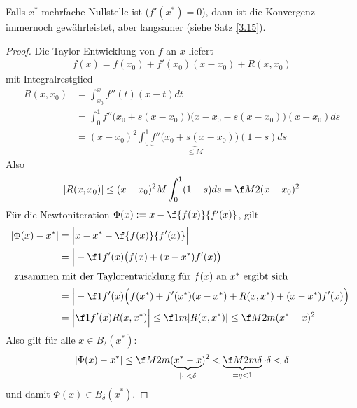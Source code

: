 \documentclass[11pt]{scrartcl}
\begin{document}
\begin{st}
\begin{note}
\begin{itemize}
				Falls $x^*$ mehrfache Nullstelle ist ($f'(x^*)=0$), dann ist die Konvergenz immernoch gewährleistet, aber langsamer (siehe Satz \ref{3.15}).
		\end{itemize}
		\begin{proof}
			Die Taylor-Entwicklung von $f$ an $x$ liefert
			\begin{align*}
				f(x) = f(x_0) + f'(x_0)(x-x_0) + R(x,x_0)
			\end{align*}
			mit Integralrestglied
			\begin{align*}
				R(x,x_0) 
				&= \int_{x_0}^x f''(t) (x-t) dt \\
				&= \int_0^1 f''\Big(x_0+s(x-x_0)\Big)  \Big(x-x_0-s(x-x_0)\Big)(x-x_0) ds \\
				&= (x-x_0)^2 \int_0^1 \underbrace{f''\big(x_0+s(x-x_0)\big)}_{\le M} (1-s) ds
			\end{align*}
			Also
			\[
				|R(x,x_0) | \le (x-x_0)^2 M \int_0^1 (1-s) ds = \f M2 (x-x_0)^2
			\]
			Für die Newtoniteration $\Phi(x) := x - \f {f(x)}{f'(x)}$, gilt
			\begin{align*}
				|\Phi(x) - x^*|
				&= \Big|x-x^* - \f {f(x)}{f'(x)}\Big| \\
				&= \Big| -\f 1{f'(x)} \big(f(x) + (x-x^*)f'(x) \big) \Big| \\
			\intertext{
				zusammen mit der Taylorentwicklung für $f(x)$ an $x^*$ ergibt sich
			}
				&= \Big| -\f 1{f'(x)} \Big(f(x^*) + f'(x^*)(x-x^*) + R(x,x^*) + (x-x^*)f'(x)\Big) \Big| \\
				&= \Big| \f 1{f'(x)} R(x,x^*) \Big| 
				\le \f 1m |R(x,x^*)| 
				\le \f M{2m} (x^* - x)^2
			\end{align*}
			Also gilt für alle $x\in B_\delta(x^*)$:
			\[
				|\Phi(x) - x^*| \le \f M{2m}(\underbrace{x^*-x}_{|\cdot|<\delta})^2 < \underbrace{\f M{2m} \delta}_{=q<1} \cdot \delta < \delta
			\]
			und damit $\Phi(x) \in B_\delta(x^*)$.


\end{proof}
\end{note}
\end{st}
\end{document}
